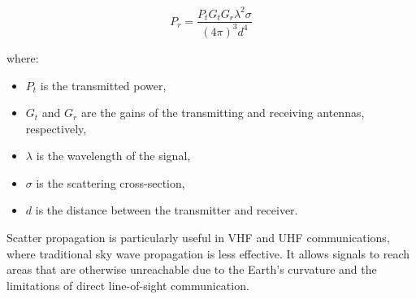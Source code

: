 \[
P_r = \frac{P_t G_t G_r \lambda^2 \sigma}{(4\pi)^3 d^4}
\]

where:
\begin{itemize}
    \item \(P_t\) is the transmitted power,
    \item \(G_t\) and \(G_r\) are the gains of the transmitting and receiving antennas, respectively,
    \item \(\lambda\) is the wavelength of the signal,
    \item \(\sigma\) is the scattering cross-section,
    \item \(d\) is the distance between the transmitter and receiver.
\end{itemize}

Scatter propagation is particularly useful in VHF and UHF communications, where traditional sky wave propagation is less effective. It allows signals to reach areas that are otherwise unreachable due to the Earth's curvature and the limitations of direct line-of-sight communication.

